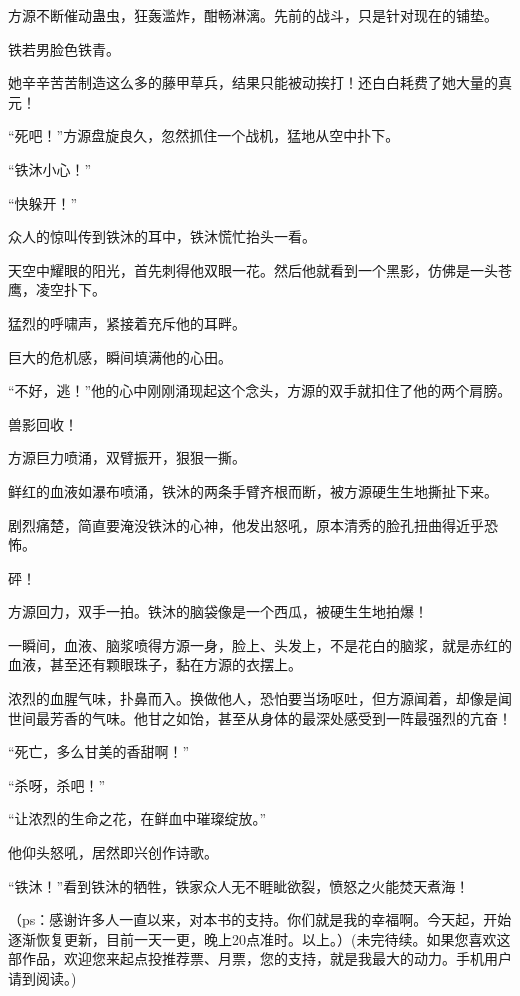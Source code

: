 \begin{this_body}
方源不断催动蛊虫，狂轰滥炸，酣畅淋漓。先前的战斗，只是针对现在的铺垫。

铁若男脸色铁青。

她辛辛苦苦制造这么多的藤甲草兵，结果只能被动挨打！还白白耗费了她大量的真元！

“死吧！”方源盘旋良久，忽然抓住一个战机，猛地从空中扑下。

“铁沐小心！”

“快躲开！”

众人的惊叫传到铁沐的耳中，铁沐慌忙抬头一看。

天空中耀眼的阳光，首先刺得他双眼一花。然后他就看到一个黑影，仿佛是一头苍鹰，凌空扑下。

猛烈的呼啸声，紧接着充斥他的耳畔。

巨大的危机感，瞬间填满他的心田。

“不好，逃！”他的心中刚刚涌现起这个念头，方源的双手就扣住了他的两个肩膀。

兽影回收！

方源巨力喷涌，双臂振开，狠狠一撕。

鲜红的血液如瀑布喷涌，铁沐的两条手臂齐根而断，被方源硬生生地撕扯下来。

剧烈痛楚，简直要淹没铁沐的心神，他发出怒吼，原本清秀的脸孔扭曲得近乎恐怖。

砰！

方源回力，双手一拍。铁沐的脑袋像是一个西瓜，被硬生生地拍爆！

一瞬间，血液、脑浆喷得方源一身，脸上、头发上，不是花白的脑浆，就是赤红的血液，甚至还有颗眼珠子，黏在方源的衣摆上。

浓烈的血腥气味，扑鼻而入。换做他人，恐怕要当场呕吐，但方源闻着，却像是闻世间最芳香的气味。他甘之如饴，甚至从身体的最深处感受到一阵最强烈的亢奋！

“死亡，多么甘美的香甜啊！”

“杀呀，杀吧！”

“让浓烈的生命之花，在鲜血中璀璨绽放。”

他仰头怒吼，居然即兴创作诗歌。

“铁沐！”看到铁沐的牺牲，铁家众人无不睚眦欲裂，愤怒之火能焚天煮海！

（ps：感谢许多人一直以来，对本书的支持。你们就是我的幸福啊。今天起，开始逐渐恢复更新，目前一天一更，晚上20点准时。以上。）(未完待续。如果您喜欢这部作品，欢迎您来起点投推荐票、月票，您的支持，就是我最大的动力。手机用户请到阅读。)

\end{this_body}

